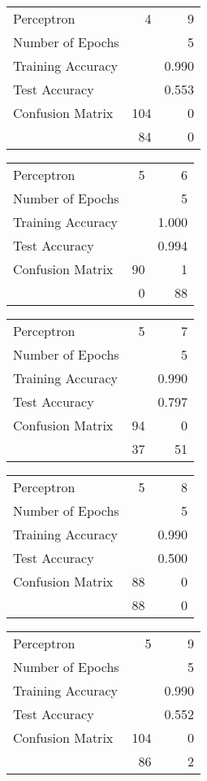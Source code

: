 \documentclass[11pt]{article}
\begin{document}
\begin{minipage}[t]{0.5\textwidth}
\begin{tabular}{|l | r r|}
\hline Perceptron & 4 & 9\\
Number of Epochs & & 5\\
Training Accuracy & & 0.990\\
Test Accuracy & & 0.553\\
Confusion Matrix & 104 & 0\\
 &84 & 0\\ \hline
\end{tabular}
\end{minipage}
\begin{minipage}[t]{0.5\textwidth}
\begin{tabular}{|l | r r|}
\hline Perceptron & 5 & 6\\
Number of Epochs & & 5\\
Training Accuracy & & 1.000\\
Test Accuracy & & 0.994\\
Confusion Matrix & 90 & 1\\
 &0 & 88\\ \hline
\end{tabular}
\end{minipage}
\begin{minipage}[t]{0.5\textwidth}
\begin{tabular}{|l | r r|}
\hline Perceptron & 5 & 7\\
Number of Epochs & & 5\\
Training Accuracy & & 0.990\\
Test Accuracy & & 0.797\\
Confusion Matrix & 94 & 0\\
 &37 & 51\\ \hline
\end{tabular}
\end{minipage}
\begin{minipage}[t]{0.5\textwidth}
\begin{tabular}{|l | r r|}
\hline Perceptron & 5 & 8\\
Number of Epochs & & 5\\
Training Accuracy & & 0.990\\
Test Accuracy & & 0.500\\
Confusion Matrix & 88 & 0\\
 &88 & 0\\ \hline
\end{tabular}
\end{minipage}
\begin{minipage}[t]{0.5\textwidth}
\begin{tabular}{|l | r r|}
\hline Perceptron & 5 & 9\\
Number of Epochs & & 5\\
Training Accuracy & & 0.990\\
Test Accuracy & & 0.552\\
Confusion Matrix & 104 & 0\\
 &86 & 2\\ \hline
\end{tabular}
\end{minipage}
\end{document}
